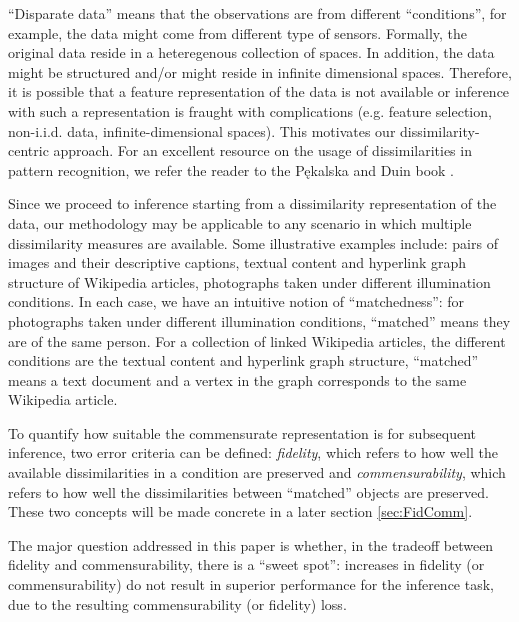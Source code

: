 \documentclass[12pt]{article} %
\begin{document}
     ``Disparate data''  means that  the observations are from  different ``conditions'', for example, the data might come from different type of sensors. Formally, the original data  reside in a heteregenous collection of  spaces.  In addition, the data might be structured and/or might reside in  infinite dimensional spaces. Therefore, it is possible that a feature representation of the data is not available or inference with such a representation is fraught with complications (e.g. feature selection, non-i.i.d. data, infinite-dimensional spaces). This motivates our  dissimilarity-centric approach. For an excellent resource on the usage of dissimilarities in pattern recognition, we refer the reader to the P\k{e}kalska and Duin book \cite{duin2005dissimilarity}.
		
		Since we proceed to inference starting from a dissimilarity representation of the data, our methodology may be applicable to any scenario in which multiple dissimilarity measures are available.  Some illustrative examples include:  pairs of images and their descriptive captions,  textual content  and  hyperlink graph
structure of  Wikipedia  articles, photographs taken under different illumination conditions. In each case, we have an intuitive notion of ``matchedness'': for photographs taken under different illumination conditions, ``matched'' means they are of the same person. For a collection of linked Wikipedia articles, the different conditions  are  the textual content and hyperlink graph structure, ``matched'' means a text document and  a vertex  in the graph corresponds to the same Wikipedia article. 

    To quantify how suitable the commensurate representation is for subsequent inference, two error criteria can be defined: \emph{fidelity}, which refers to how well the available dissimilarities in a condition are preserved and \emph{commensurability}, which refers to how well the dissimilarities between ``matched'' objects are preserved. These two concepts will be made concrete in a later section \ref{sec:FidComm}.

The major question  addressed in this paper is whether, in the tradeoff between fidelity and commensurability, there is a ``sweet spot'': increases in fidelity (or commensurability) do not result in superior performance for  the inference task, due to the resulting commensurability (or fidelity) loss. 
\end{document}
